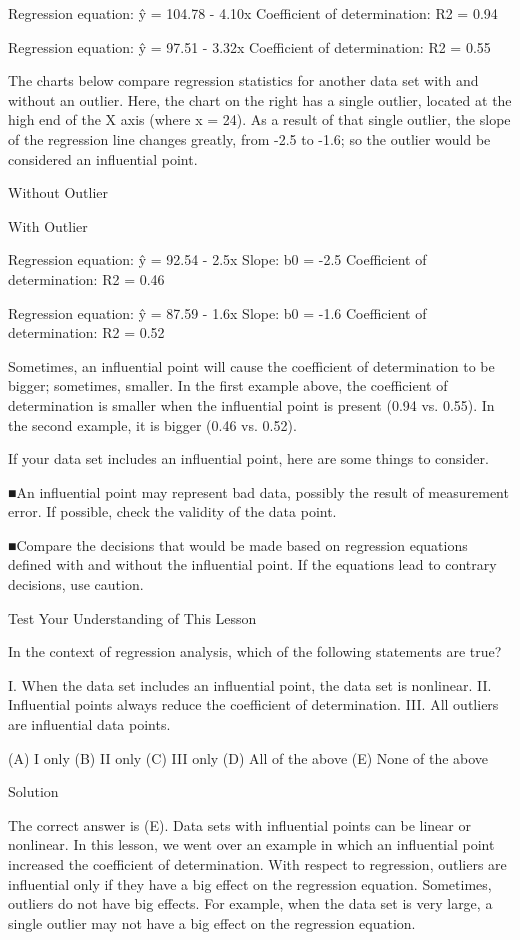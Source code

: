  Regression equation: ŷ = 104.78 - 4.10x
 Coefficient of determination: R2 = 0.94 


Regression equation: ŷ = 97.51 - 3.32x
 Coefficient of determination: R2 = 0.55 


The charts below compare regression statistics for another data set with and without an outlier. Here, the chart on the right has a single outlier, located at the high end of the X axis (where x = 24). As a result of that single outlier, the slope of the regression line changes greatly, from -2.5 to -1.6; so the outlier would be considered an influential point.



Without Outlier


With Outlier










 Regression equation: ŷ = 92.54 - 2.5x
 Slope: b0 = -2.5
 Coefficient of determination: R2 = 0.46 


Regression equation: ŷ = 87.59 - 1.6x
 Slope: b0 = -1.6
 Coefficient of determination: R2 = 0.52 


Sometimes, an influential point will cause the coefficient of determination to be bigger; sometimes, smaller. In the first example above, the coefficient of determination is smaller when the influential point is present (0.94 vs. 0.55). In the second example, it is bigger (0.46 vs. 0.52).

If your data set includes an influential point, here are some things to consider.


■An influential point may represent bad data, possibly the result of measurement error. If possible, check the validity of the data point.


■Compare the decisions that would be made based on regression equations defined with and without the influential point. If the equations lead to contrary decisions, use caution.

Test Your Understanding of This Lesson

In the context of regression analysis, which of the following statements are true?

 I. When the data set includes an influential point, the data set is nonlinear. 
II. Influential points always reduce the coefficient of determination. 
III. All outliers are influential data points. 

(A) I only 
(B) II only 
(C) III only 
(D) All of the above 
(E) None of the above 

Solution

The correct answer is (E). Data sets with influential points can be linear or nonlinear. In this lesson, we went over an example in which an influential point increased the coefficient of determination. With respect to regression, outliers are influential only if they have a big effect on the regression equation. Sometimes, outliers do not have big effects. For example, when the data set is very large, a single outlier may not have a big effect on the regression equation.

